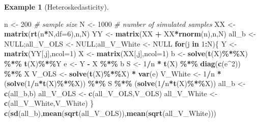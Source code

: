 \documentclass[
  12pt,
]{book}
\newenvironment{Shaded}{\begin{snugshade}}{\end{snugshade}}
\newcommand{\AttributeTok}[1]{\textcolor[rgb]{0.13,0.29,0.53}{#1}}
\newcommand{\CommentTok}[1]{\textcolor[rgb]{0.56,0.35,0.01}{\textit{#1}}}
\newcommand{\ConstantTok}[1]{\textcolor[rgb]{0.56,0.35,0.01}{#1}}
\newcommand{\ControlFlowTok}[1]{\textcolor[rgb]{0.13,0.29,0.53}{\textbf{#1}}}
\newcommand{\DecValTok}[1]{\textcolor[rgb]{0.00,0.00,0.81}{#1}}
\newcommand{\FunctionTok}[1]{\textcolor[rgb]{0.13,0.29,0.53}{\textbf{#1}}}
\newcommand{\NormalTok}[1]{#1}
\newcommand{\OtherTok}[1]{\textcolor[rgb]{0.56,0.35,0.01}{#1}}
\newcommand{\SpecialCharTok}[1]{\textcolor[rgb]{0.81,0.36,0.00}{\textbf{#1}}}
\theoremstyle{definition}
\theoremstyle{definition}
\newtheorem{example}{Example}[chapter]
\theoremstyle{definition}
\theoremstyle{definition}
\theoremstyle{remark}
\begin{document}
\begin{example}[Heteroskedasticity]
\begin{Shaded}
\begin{Highlighting}[]
\NormalTok{n }\OtherTok{\textless{}{-}} \DecValTok{200} \CommentTok{\# sample size}
\NormalTok{N }\OtherTok{\textless{}{-}} \DecValTok{1000} \CommentTok{\# number of simulated samples}
\NormalTok{XX }\OtherTok{\textless{}{-}} \FunctionTok{matrix}\NormalTok{(}\FunctionTok{rt}\NormalTok{(n}\SpecialCharTok{*}\NormalTok{N,}\AttributeTok{df=}\DecValTok{6}\NormalTok{),n,N)}
\NormalTok{YY }\OtherTok{\textless{}{-}} \FunctionTok{matrix}\NormalTok{(XX }\SpecialCharTok{+}\NormalTok{ XX}\SpecialCharTok{*}\FunctionTok{rnorm}\NormalTok{(n),n,N)}
\NormalTok{all\_b       }\OtherTok{\textless{}{-}} \ConstantTok{NULL}\NormalTok{;all\_V\_OLS   }\OtherTok{\textless{}{-}} \ConstantTok{NULL}\NormalTok{;all\_V\_White }\OtherTok{\textless{}{-}} \ConstantTok{NULL}
\ControlFlowTok{for}\NormalTok{(j }\ControlFlowTok{in} \DecValTok{1}\SpecialCharTok{:}\NormalTok{N)\{}
\NormalTok{  Y }\OtherTok{\textless{}{-}} \FunctionTok{matrix}\NormalTok{(YY[,j],}\AttributeTok{ncol=}\DecValTok{1}\NormalTok{)}
\NormalTok{  X }\OtherTok{\textless{}{-}} \FunctionTok{matrix}\NormalTok{(XX[,j],}\AttributeTok{ncol=}\DecValTok{1}\NormalTok{)}
\NormalTok{  b }\OtherTok{\textless{}{-}} \FunctionTok{solve}\NormalTok{(}\FunctionTok{t}\NormalTok{(X)}\SpecialCharTok{\%*\%}\NormalTok{X) }\SpecialCharTok{\%*\%} \FunctionTok{t}\NormalTok{(X)}\SpecialCharTok{\%*\%}\NormalTok{Y}
\NormalTok{  e }\OtherTok{\textless{}{-}}\NormalTok{ Y }\SpecialCharTok{{-}}\NormalTok{ X }\SpecialCharTok{\%*\%}\NormalTok{ b}
\NormalTok{  S }\OtherTok{\textless{}{-}} \DecValTok{1}\SpecialCharTok{/}\NormalTok{n }\SpecialCharTok{*} \FunctionTok{t}\NormalTok{(X) }\SpecialCharTok{\%*\%} \FunctionTok{diag}\NormalTok{(}\FunctionTok{c}\NormalTok{(e}\SpecialCharTok{\^{}}\DecValTok{2}\NormalTok{)) }\SpecialCharTok{\%*\%}\NormalTok{ X}
\NormalTok{  V\_OLS   }\OtherTok{\textless{}{-}} \FunctionTok{solve}\NormalTok{(}\FunctionTok{t}\NormalTok{(X)}\SpecialCharTok{\%*\%}\NormalTok{X) }\SpecialCharTok{*} \FunctionTok{var}\NormalTok{(e)}
\NormalTok{  V\_White }\OtherTok{\textless{}{-}} \DecValTok{1}\SpecialCharTok{/}\NormalTok{n }\SpecialCharTok{*}\NormalTok{ (}\FunctionTok{solve}\NormalTok{(}\DecValTok{1}\SpecialCharTok{/}\NormalTok{n}\SpecialCharTok{*}\FunctionTok{t}\NormalTok{(X)}\SpecialCharTok{\%*\%}\NormalTok{X)) }\SpecialCharTok{\%*\%}\NormalTok{ S }\SpecialCharTok{\%*\%}\NormalTok{ (}\FunctionTok{solve}\NormalTok{(}\DecValTok{1}\SpecialCharTok{/}\NormalTok{n}\SpecialCharTok{*}\FunctionTok{t}\NormalTok{(X)}\SpecialCharTok{\%*\%}\NormalTok{X))}
\NormalTok{  all\_b       }\OtherTok{\textless{}{-}} \FunctionTok{c}\NormalTok{(all\_b,b)}
\NormalTok{  all\_V\_OLS   }\OtherTok{\textless{}{-}} \FunctionTok{c}\NormalTok{(all\_V\_OLS,V\_OLS)}
\NormalTok{  all\_V\_White }\OtherTok{\textless{}{-}} \FunctionTok{c}\NormalTok{(all\_V\_White,V\_White)}
\NormalTok{\}}
\FunctionTok{c}\NormalTok{(}\FunctionTok{sd}\NormalTok{(all\_b),}\FunctionTok{mean}\NormalTok{(}\FunctionTok{sqrt}\NormalTok{(all\_V\_OLS)),}\FunctionTok{mean}\NormalTok{(}\FunctionTok{sqrt}\NormalTok{(all\_V\_White)))}
\end{Highlighting}
\end{Shaded}


\end{example}
\end{document}
